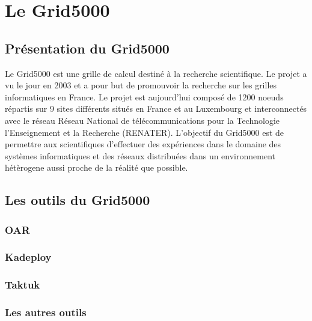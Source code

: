 \part{Le Grid5000}
\chapter{Présentation du Grid5000}
Le Grid5000 est une grille de calcul destiné à la recherche scientifique. Le projet a vu le jour en 2003 et a pour but de promouvoir la recherche sur les grilles informatiques en France. Le projet est aujourd'hui composé de 1200 noeuds répartis sur 9 sites différents situés en France et au Luxembourg et interconnectés avec le réseau Réseau National de télécommunications pour la Technologie l'Enseignement et la Recherche (RENATER). L'objectif du Grid5000 est de permettre aux scientifiques d'effectuer des expériences dans le domaine des systèmes informatiques et des réseaux distribuées dans un environnement hétèrogene aussi proche de la réalité que possible.
\chapter{Les outils du Grid5000}
\section{OAR}
\section{Kadeploy}
\section{Taktuk}
\section{Les autres outils}
